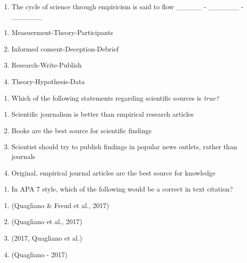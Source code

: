 \documentclass[
  12pt,
  letterpaper,
  DIV=11,
  numbers=noendperiod]{scrartcl}
\providecommand{\tightlist}{%
  \setlength{\itemsep}{0pt}\setlength{\parskip}{0pt}}\usepackage{longtable,booktabs,array}
\begin{document}
\begin{enumerate}
\def\labelenumi{\arabic{enumi}.}
\setcounter{enumi}{2}
\tightlist
\item
  The cycle of science through empiricism is said to flow \_\_\_\_\_ -
  \_\_\_\_\_\_ - \_\_\_\_\_\_
\end{enumerate}

\begin{enumerate}
\def\labelenumi{\alph{enumi}.}
\tightlist
\item
  Measuerment-Theory-Participants
\item
  Informed consent-Deception-Debrief
\item
  Research-Write-Publish
\item
  Theory-Hypothesis-Data
\end{enumerate}

\begin{enumerate}
\def\labelenumi{\arabic{enumi}.}
\setcounter{enumi}{3}
\tightlist
\item
  Which of the following statements regarding scientific sources is
  \emph{true?}
\end{enumerate}

\begin{enumerate}
\def\labelenumi{\alph{enumi}.}
\tightlist
\item
  Scientific journalism is better than empirical research articles
\item
  Books are the best source for scientific findings
\item
  Scientist should try to publish findings in popular news outlets,
  rather than journals
\item
  Original, empirical journal articles are the best source for knowledge
\end{enumerate}

\begin{enumerate}
\def\labelenumi{\arabic{enumi}.}
\setcounter{enumi}{4}
\tightlist
\item
  In APA 7 style, which of the following would be a correct in text
  citation?
\end{enumerate}

\begin{enumerate}
\def\labelenumi{\alph{enumi}.}
\tightlist
\item
  (Quagliano \& Freud et al., 2017)
\item
  (Quagliano et al., 2017)
\item
  (2017, Quagliano et al.)
\item
  (Quagliano - 2017)
\end{enumerate}
\end{document}
